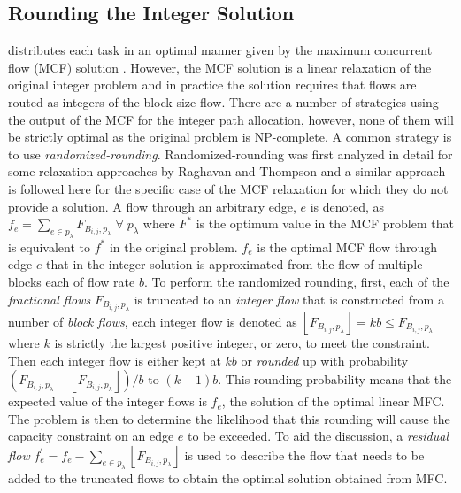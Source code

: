 \subsection{Rounding the Integer Solution}
\name distributes each task in an optimal manner given by the maximum concurrent flow (MCF) solution \cite{reed2012traffic}. However, the MCF solution is a linear relaxation of the original integer problem and in practice the solution requires that flows are routed as integers of the block size flow. There are a number of strategies using the output of the MCF for the integer path allocation, however, none of them will be strictly optimal as the original problem is NP-complete. A common strategy is to use \emph{randomized-rounding}. Randomized-rounding was first analyzed in detail for some relaxation approaches by Raghavan and Thompson \cite{Raghavan1987} and a similar approach is followed here for the specific case of the MCF relaxation for which they do not provide a solution. A flow through an arbitrary edge, \(e\) is denoted, as \(f_e=\sum_{e \in p_\lambda} F_{B_{i,j},p_\lambda} \; \forall \; p_\lambda\) where $F^*$ is the optimum value in the MCF problem that is equivalent to $f^*$ in the original problem. $f_e$ is the optimal MCF flow through edge $e$ that in the integer solution is approximated from the flow of multiple blocks each of flow rate $b$. To perform the randomized rounding, first, each of the \emph{fractional flows}  $F_{B_{i,j},p_\lambda}$ is truncated to an \emph{integer flow} that is constructed from a number of\emph{ block flows}, each integer flow is denoted as $\left \lfloor F_{B_{i,j},p_\lambda} \right \rfloor = kb \leq F_{B_{i,j},p_\lambda}$ where $k$ is strictly the largest positive integer, or zero, to meet the constraint. Then each integer flow is either kept at $kb$ or \emph{rounded} up with probability $(F_{B_{i,j},p_\lambda} - \left \lfloor{F_{B_{i,j},p_\lambda}} \right \rfloor)/b$ to $(k+1)b$. This rounding probability means that the expected value of the integer flows is $f_e$, the solution of the optimal linear MFC. The problem is then to determine the likelihood that this rounding will cause the capacity constraint on an edge $e$ to be exceeded. To aid the discussion, a \emph{residual flow}  $f^\prime_e=f_e - \sum_{e \in p_\lambda} \left \lfloor{F_{B_{i,j},p_\lambda}} \right \rfloor $ is used to describe the flow that needs to be added to the truncated flows to obtain the optimal solution obtained from MFC.

